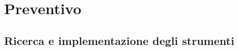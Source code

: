 %


\section{Preventivo} %
\label{sec:preventivo}
	\subsection{Ricerca e implementazione degli strumenti} %
	\label{sub:ricerca_e_implementazione_degli_strumenti}
